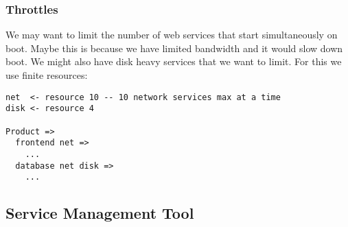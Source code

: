\documentclass{article}
\newcommand*{\bibtitle}{Bibliography}
\begin{document}
\subsubsection{Throttles}
We may want to limit the number of web services that start simultaneously on boot.
Maybe this is because we have limited bandwidth and it would slow down boot.
We might also have disk heavy services that we want to limit.
For this we use finite resources:

\begin{verbatim}
net  <- resource 10 -- 10 network services max at a time
disk <- resource 4

Product =>
  frontend net =>
    ...
  database net disk =>
    ...
\end{verbatim}

\subsection{Service Management Tool}


\setlength{\baselineskip}{0pt} %

{\renewcommand*\MakeUppercase[1]{#1}%
\printbibliography[heading=bibintoc,title={\bibtitle}]}
\end{document}
